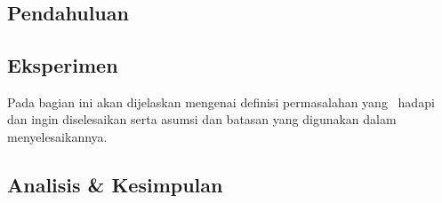 \chapter{\topikSatu}


\section{Pendahuluan}


\section{Eksperimen}
Pada bagian ini akan dijelaskan mengenai definisi permasalahan 
yang \saya~hadapi dan ingin diselesaikan serta asumsi dan batasan 
yang digunakan dalam menyelesaikannya.


\section{Analisis \& Kesimpulan}




